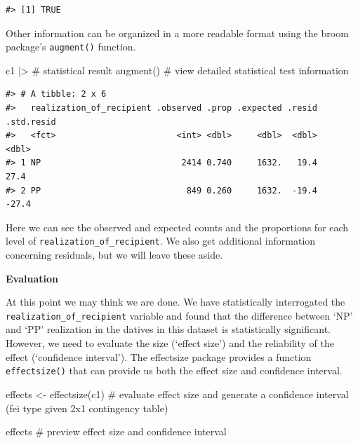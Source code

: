 \documentclass[
  letterpaper,
]{latex/krantz}
\newenvironment{Shaded}{\begin{snugshade}}{\end{snugshade}}
\newcommand{\CommentTok}[1]{\textcolor[rgb]{0.37,0.37,0.37}{#1}}
\newcommand{\FunctionTok}[1]{\textcolor[rgb]{0.28,0.35,0.67}{#1}}
\newcommand{\NormalTok}[1]{\textcolor[rgb]{0.00,0.23,0.31}{#1}}
\newcommand{\OtherTok}[1]{\textcolor[rgb]{0.00,0.23,0.31}{#1}}
\newcommand{\SpecialCharTok}[1]{\textcolor[rgb]{0.37,0.37,0.37}{#1}}
\begin{document}
\begin{verbatim}
#> [1] TRUE
\end{verbatim}

Other information can be organized in a more readable format using the
broom package's \texttt{augment()} function.

\begin{Shaded}
\begin{Highlighting}[]
\NormalTok{c1 }\SpecialCharTok{|\textgreater{}} \CommentTok{\# statistical result}
  \FunctionTok{augment}\NormalTok{() }\CommentTok{\# view detailed statistical test information}
\end{Highlighting}
\end{Shaded}

\begin{verbatim}
#> # A tibble: 2 x 6
#>   realization_of_recipient .observed .prop .expected .resid .std.resid
#>   <fct>                        <int> <dbl>     <dbl>  <dbl>      <dbl>
#> 1 NP                            2414 0.740     1632.   19.4       27.4
#> 2 PP                             849 0.260     1632.  -19.4      -27.4
\end{verbatim}

Here we can see the observed and expected counts and the proportions for
each level of \texttt{realization\_of\_recipient}. We also get
additional information concerning residuals, but we will leave these
aside.

\textbf{Evaluation}

At this point we may think we are done. We have statistically
interrogated the \texttt{realization\_of\_recipient} variable and found
that the difference between `NP' and `PP' realization in the datives in
this dataset is statistically significant. However, we need to evaluate
the size (`effect size') and the reliability of the effect (`confidence
interval'). The effectsize package provides a function
\texttt{effectsize()} that can provide us both the effect size and
confidence interval.

\begin{Shaded}
\begin{Highlighting}[]
\NormalTok{effects }\OtherTok{\textless{}{-}} 
  \FunctionTok{effectsize}\NormalTok{(c1) }\CommentTok{\# evaluate effect size and generate a confidence interval (fei type given 2x1 contingency table)}

\NormalTok{effects }\CommentTok{\# preview effect size and confidence interval}
\end{Highlighting}
\end{Shaded}
\end{document}
